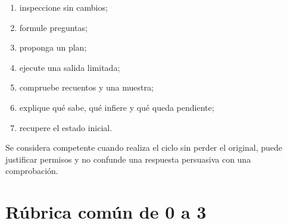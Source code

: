 \documentclass[10pt,a4paper,openany]{book}
\providecommand{\tightlist}{\setlength{\itemsep}{0.18em}\setlength{\parskip}{0pt}}
\begin{document}
\begin{enumerate}
\def\labelenumi{\arabic{enumi}.}
\tightlist
\item
  inspeccione sin cambios;
\item
  formule preguntas;
\item
  proponga un plan;
\item
  ejecute una salida limitada;
\item
  compruebe recuentos y una muestra;
\item
  explique qué sabe, qué infiere y qué queda pendiente;
\item
  recupere el estado inicial.
\end{enumerate}

Se considera competente cuando realiza el ciclo sin perder el original,
puede justificar permisos y no confunde una respuesta persuasiva con una
comprobación.

\section{Rúbrica común de 0 a 3}\label{ruxfabrica-comuxfan-de-0-a-3}
\end{document}
